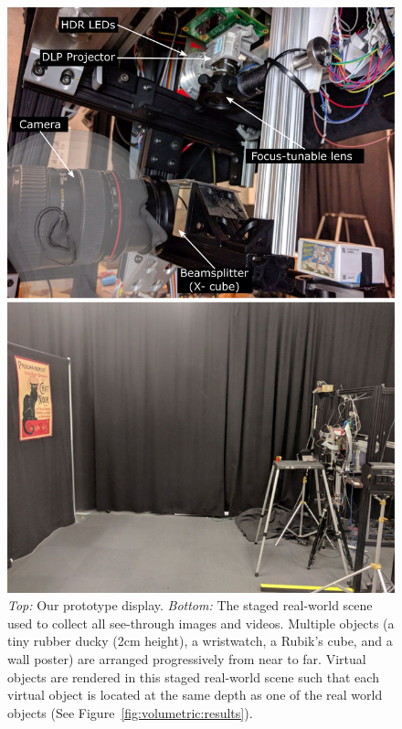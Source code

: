 \begin{figure}[tb!]
\centering
\includegraphics[width=0.8\columnwidth]{images/volumetric/setup}
\caption[Volumetric NED: prototype and staged real-world scene for capturing results]{\emph{Top:} Our prototype display. \emph{Bottom:} The staged real-world scene used to collect all see-through images and videos. Multiple objects (a tiny rubber ducky (2cm height), a wristwatch, a Rubik's cube, and a wall poster) are arranged progressively from near to far. Virtual objects are rendered in this staged real-world scene such that each virtual object is located at the same depth as one of the real world objects (See Figure~\ref{fig:volumetric:results}).}
\label{fig:volumetric:setup}
\end{figure}

